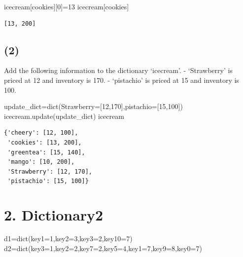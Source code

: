 \documentclass[
  letterpaper,
  DIV=11,
  numbers=noendperiod]{scrreprt}
\newenvironment{Shaded}{\begin{snugshade}}{\end{snugshade}}
\newcommand{\BuiltInTok}[1]{\textcolor[rgb]{0.00,0.23,0.31}{#1}}
\newcommand{\DecValTok}[1]{\textcolor[rgb]{0.68,0.00,0.00}{#1}}
\newcommand{\NormalTok}[1]{\textcolor[rgb]{0.00,0.23,0.31}{#1}}
\newcommand{\OperatorTok}[1]{\textcolor[rgb]{0.37,0.37,0.37}{#1}}
\newcommand{\StringTok}[1]{\textcolor[rgb]{0.13,0.47,0.30}{#1}}
\begin{document}
\begin{Shaded}
\begin{Highlighting}[]
\NormalTok{icecream[}\StringTok{\textquotesingle{}cookies\textquotesingle{}}\NormalTok{][}\DecValTok{0}\NormalTok{]}\OperatorTok{=}\DecValTok{13}
\NormalTok{icecream[}\StringTok{\textquotesingle{}cookies\textquotesingle{}}\NormalTok{]}
\end{Highlighting}
\end{Shaded}

\begin{verbatim}
[13, 200]
\end{verbatim}

\subsection*{(2)}\label{section-8}

Add the following information to the dictionary `icecream'. -
`Strawberry' is priced at 12 and inventory is 170. - `pistachio' is
priced at 15 and inventory is 100.

\begin{Shaded}
\begin{Highlighting}[]
\NormalTok{update\_dict}\OperatorTok{=}\BuiltInTok{dict}\NormalTok{(Strawberry}\OperatorTok{=}\NormalTok{[}\DecValTok{12}\NormalTok{,}\DecValTok{170}\NormalTok{],pistachio}\OperatorTok{=}\NormalTok{[}\DecValTok{15}\NormalTok{,}\DecValTok{100}\NormalTok{])}
\NormalTok{icecream.update(update\_dict)}
\NormalTok{icecream}
\end{Highlighting}
\end{Shaded}

\begin{verbatim}
{'cheery': [12, 100],
 'cookies': [13, 200],
 'greentea': [15, 140],
 'mango': [10, 200],
 'Strawberry': [12, 170],
 'pistachio': [15, 100]}
\end{verbatim}

\section*{2. Dictionary2}\label{dictionary2}


\begin{Shaded}
\begin{Highlighting}[]
\NormalTok{d1}\OperatorTok{=}\BuiltInTok{dict}\NormalTok{(key1}\OperatorTok{=}\DecValTok{1}\NormalTok{,key2}\OperatorTok{=}\DecValTok{3}\NormalTok{,key3}\OperatorTok{=}\DecValTok{2}\NormalTok{,key10}\OperatorTok{=}\DecValTok{7}\NormalTok{)}
\NormalTok{d2}\OperatorTok{=}\BuiltInTok{dict}\NormalTok{(key3}\OperatorTok{=}\DecValTok{1}\NormalTok{,key2}\OperatorTok{=}\DecValTok{2}\NormalTok{,key7}\OperatorTok{=}\DecValTok{2}\NormalTok{,key5}\OperatorTok{=}\DecValTok{4}\NormalTok{,key1}\OperatorTok{=}\DecValTok{7}\NormalTok{,key9}\OperatorTok{=}\DecValTok{8}\NormalTok{,key0}\OperatorTok{=}\DecValTok{7}\NormalTok{)}
\end{Highlighting}
\end{Shaded}
\end{document}
